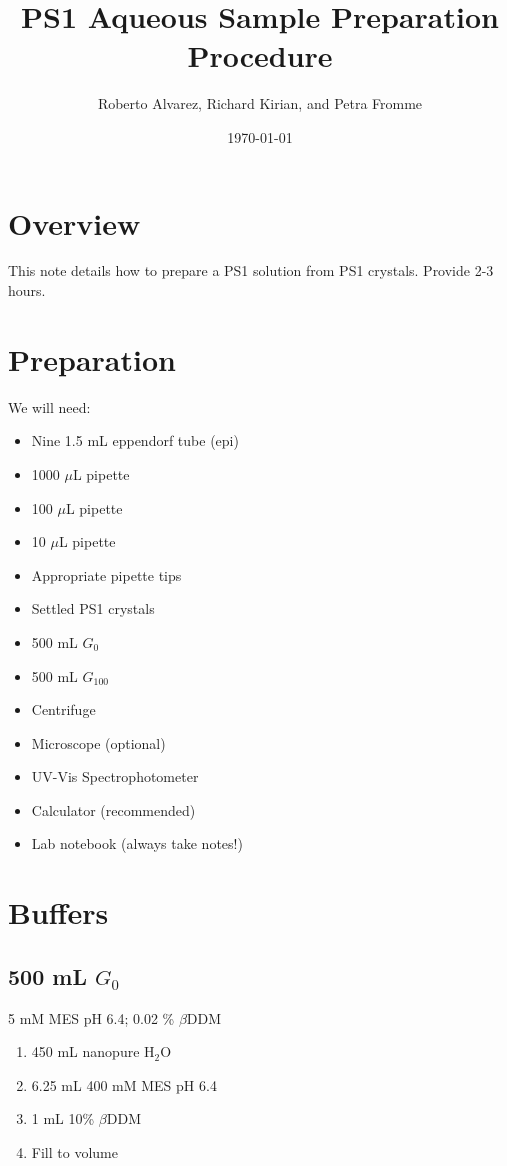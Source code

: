 \documentclass[12pt]{article}
\title{PS1 Aqueous Sample Preparation Procedure}
\author{Roberto Alvarez, Richard Kirian, and Petra Fromme}
\date{\today}
\begin{document}
    \maketitle

    \section{Overview}
    This note details how to prepare a PS1 solution from PS1 crystals. Provide 2-3 hours.

    \section{Preparation}
    We will need:
    \begin{itemize}
        \item Nine 1.5 mL eppendorf tube (epi)
        \item 1000 $\mu$L pipette
        \item 100 $\mu$L pipette
        \item 10 $\mu$L pipette
        \item Appropriate pipette tips
        \item Settled PS1 crystals
        \item 500 mL $G_{0}$
        \item 500 mL $G_{100}$
        \item Centrifuge
        \item Microscope (optional)
        \item UV-Vis Spectrophotometer
        \item Calculator (recommended)
        \item Lab notebook (always take notes!)
    \end{itemize}

    \section{Buffers}
    \subsection{500 mL $G_{0}$}
    5 mM MES pH 6.4; 0.02 \% $\beta$DDM
    \begin{enumerate}
        \item 450 mL nanopure H$_{2}$O
        \item 6.25 mL 400 mM MES pH 6.4
        \item 1 mL 10\% $\beta$DDM
        \item Fill to volume
    \end{enumerate}
\end{document}
